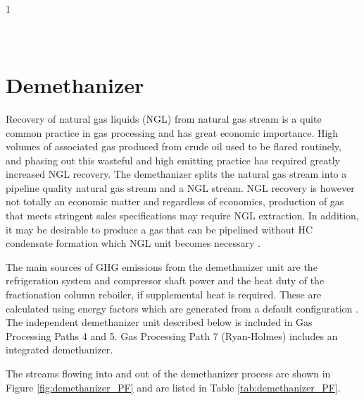 \documentclass[11pt]{report}
\begin{document}
\begin{landscape}
\begin{scriptsize}
\begin{supertabular*}{1\columnwidth}
\midrule
{}\\
\\
\\
\end{supertabular*}
\end{scriptsize}
\end{landscape}



\clearpage

\section{Demethanizer}
\label{sec:demethanizer}

Recovery of natural gas liquids (NGL) from natural gas stream is a quite common practice in gas processing and has great economic importance. High volumes of associated gas produced from crude oil used to be flared routinely, and phasing out this wasteful and high emitting practice \cite{masnadi2018global} has required greatly increased NGL recovery. The demethanizer splits the natural gas stream into a pipeline quality natural gas stream and a NGL stream. NGL recovery is however not totally an economic matter and regardless of economics, production of gas that meets stringent sales specifications may require NGL extraction. In addition, it may be desirable to produce a gas that can be pipelined without HC condensate formation which NGL unit becomes necessary \cite{Manning1991}. 

The main sources of GHG emissions from the demethanizer unit are the refrigeration system and compressor shaft power and the heat duty of the fractionation column reboiler, if supplemental heat is required. These are calculated using energy factors which are generated from a default configuration \cite{Nawaz2010}. The independent demethanizer unit described below is included in Gas Processing Paths 4 and 5. Gas Processing Path 7 (Ryan-Holmes) includes an integrated demethanizer. 

The streams flowing into and out of the demethanizer process are shown in Figure \ref{fig:demethanizer_PF} and are listed in Table \ref{tab:demethanizer_PF}.
\end{document}
